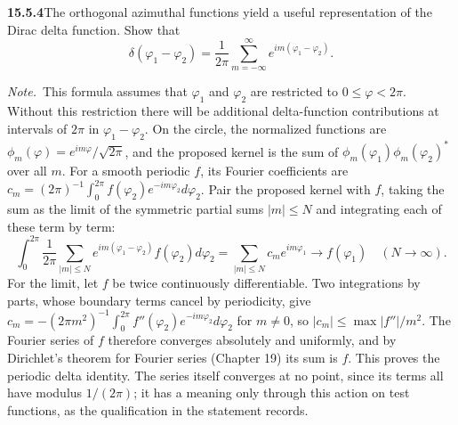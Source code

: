 \par\bigskip
\noindent\textbf{15.5.4}\quad The orthogonal azimuthal functions yield
a useful representation of the Dirac delta function. Show that 
\[
\delta(\varphi_{1}-\varphi_{2})
=\frac{1}{2\pi}\sum_{m=-\infty}^{\infty}e^{im(\varphi_{1}-\varphi_{2})}.
\]
\par\emph{Note.}~This formula assumes that $\varphi_{1}$ and
$\varphi_{2}$ are restricted to $0\le\varphi<2\pi$. Without this
restriction there will be additional delta-function contributions at
intervals of $2\pi$ in $\varphi_{1}-\varphi_{2}$.
\solution
On the circle, the normalized functions are
$\phi_m(\varphi)=e^{im\varphi}/\sqrt{2\pi}$, and the proposed kernel
is the sum of $\phi_m(\varphi_1)\phi_m(\varphi_2)^*$ over all $m$.
For a smooth periodic $f$, its Fourier coefficients are
$c_m=(2\pi)^{-1}\int_0^{2\pi}f(\varphi_2)e^{-im\varphi_2}d\varphi_2$.
Pair the proposed kernel with $f$, taking the sum as the limit of the
symmetric partial sums $|m|\le N$ and integrating each of these term
by term:
\[
\int_0^{2\pi}\frac1{2\pi}\sum_{|m|\le N}
e^{im(\varphi_1-\varphi_2)}f(\varphi_2)d\varphi_2
=\sum_{|m|\le N}c_me^{im\varphi_1}\longrightarrow f(\varphi_1)
\quad(N\to\infty).
\]
For the limit, let $f$ be twice continuously differentiable. Two
integrations by parts, whose boundary terms cancel by periodicity, give
$c_m=-(2\pi m^2)^{-1}\int_0^{2\pi}f''(\varphi_2)e^{-im\varphi_2}
d\varphi_2$ for $m\ne0$, so $|c_m|\le\max|f''|/m^2$. The Fourier
series of $f$ therefore converges absolutely and uniformly, and by
Dirichlet's theorem for Fourier series (Chapter 19) its sum is $f$.
This proves the periodic delta identity. The series itself converges
at no point, since its terms all have modulus $1/(2\pi)$; it has a
meaning only through this action on test functions, as the qualification
in the statement records.

